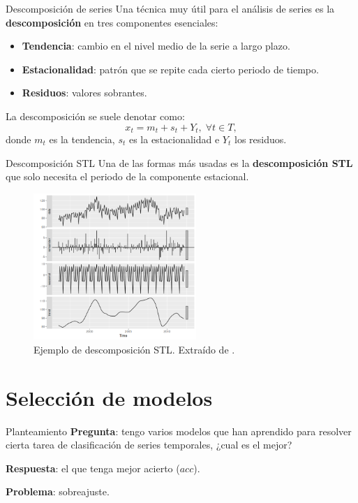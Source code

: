 \documentclass[spanish]{beamer}
\begin{document}
\begin{frame}{Descomposición de series}
  Una técnica muy útil para el análisis de series es la \textbf{descomposición} en tres componentes esenciales:
  \pause
  \begin{itemize}[<+->]
    \item \textbf{Tendencia}: cambio en el nivel medio de la serie a largo plazo.
    \item \textbf{Estacionalidad}: patrón que se repite cada cierto periodo de tiempo.
    \item \textbf{Residuos}: valores sobrantes.
  \end{itemize}
  \pause[\thebeamerpauses]
  La descomposición se suele denotar como: $$x_t = m_t + s_t + Y_t, \; \forall t \in T,$$
  donde $m_t$ es la tendencia, $s_t$ es la estacionalidad e $Y_t$ los residuos.
\end{frame}

\begin{frame}{Descomposición STL}
  Una de las formas más usadas es la \textbf{descomposición STL} que solo necesita el periodo de la componente estacional.

  \begin{figure}
    \centering
    \includegraphics[width=0.55\textwidth]{img/stl-decomposition}
    \caption{Ejemplo de descomposición STL. Extraído de \cite{timeseries}.}
  \end{figure}
\end{frame}

\section{Selección de modelos}

\begin{frame}{Planteamiento}
  \textbf{Pregunta}: tengo varios modelos que han aprendido para resolver cierta tarea de clasificación de series temporales, ¿cual es el mejor?

  \pause

  \textbf{Respuesta}: el que tenga mejor acierto ($acc$).

  \pause

  \textbf{Problema}: sobreajuste.
\end{frame}
\end{document}
